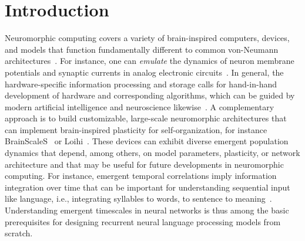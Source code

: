 \section{\label{sec:introduction}Introduction}

Neuromorphic computing covers a variety of brain-inspired computers, devices, and models that function fundamentally different to common von-Neumann architectures~\cite{schuman_survey_2017-1, furber_large-scale_2016}.
For instance, one can \emph{emulate} the dynamics of neuron membrane potentials and synaptic currents in analog electronic circuits~\cite{schemmel_modeling_2007, schemmel_wafer-scale_2010, friedmann_demonstrating_2017, moradi_scalable_2018, benjamin_neurogrid_2014}.
In general, the hardware-specific information processing and storage calls for hand-in-hand development of hardware and corresponding algorithms, which can be guided by modern artificial intelligence and neuroscience likewise~\cite{markovic_physics_2020}.
A complementary approach is to build customizable, large-scale neuromorphic architectures that can implement brain-inspired plasticity for self-organization, for instance BrainScaleS~\cite{pehle_brainscales-2_2022} or Loihi~\cite{davies_loihi_2018}.
These devices can exhibit diverse emergent population dynamics that depend, among others, on model parameters, plasticity, or network architecture and that may be useful for future developments in neuromorphic computing.
For instance, emergent temporal correlations imply information integration over time that can be important for understanding sequential input like language, i.e., integrating syllables to words, to sentence to meaning~\cite{hasson_hierarchical_2015, rudelt_embedding_2021, cramer_heidelberg_2022}.
Understanding emergent timescales in neural networks is thus among the basic prerequisites for designing recurrent neural language processing models from scratch.





